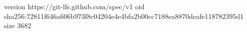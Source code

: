 version https://git-lfs.github.com/spec/v1
oid sha256:72811f646a606b973f8c04204e4e4bfa2b00cc7188ea8870deafe118782395d1
size 3682
